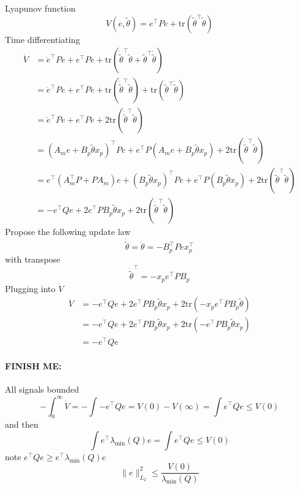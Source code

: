 Lyapunov function
\begin{equation*}
  V(e,\tilde{\theta})=e^{\top}Pe+\text{tr}\left(\tilde{\theta}^{\top}\tilde{\theta}\right)
\end{equation*}
Time differentiating
\begin{align*}
  \dot{V}
  &
  =\dot{e}^{\top}Pe
  +e^{\top}P\dot{e}
  +\text{tr}\left(\dot{\tilde{\theta}}^{\top}\tilde{\theta}+\tilde{\theta}^{\top}\dot{\tilde{\theta}}\right) \\
  &
  =\dot{e}^{\top}Pe
  +e^{\top}P\dot{e}
  +\text{tr}\left(\dot{\tilde{\theta}}^{\top}\tilde{\theta}\right)
  +\text{tr}\left(\tilde{\theta}^{\top}\dot{\tilde{\theta}}\right) \\
  &
  =\dot{e}^{\top}Pe
  +e^{\top}P\dot{e}
  +2\text{tr}\left(\dot{\tilde{\theta}}^{\top}\tilde{\theta}\right) \\
  &
  =(A_{m}e+B_{p}\tilde{\theta}x_{p})^{\top}Pe
  +e^{\top}P(A_{m}e+B_{p}\tilde{\theta}x_{p})
  +2\text{tr}\left(\dot{\tilde{\theta}}^{\top}\tilde{\theta}\right) \\
  &
  =e^{\top}(A_{m}^{\top}P+PA_{m})e
  +(B_{p}\tilde{\theta}x_{p})^{\top}Pe
  +e^{\top}P(B_{p}\tilde{\theta}x_{p})
  +2\text{tr}\left(\dot{\tilde{\theta}}^{\top}\tilde{\theta}\right) \\
  &
  =-e^{\top}Qe
  +2e^{\top}PB_{p}\tilde{\theta}x_{p}
  +2\text{tr}\left(\dot{\tilde{\theta}}^{\top}\tilde{\theta}\right)
\end{align*}
Propose the following update law
\begin{equation*}
  \dot{\tilde{\theta}}=\dot{\theta}=-B_{p}^{\top}Pex_{p}^{\top}
\end{equation*}
with transpose
\begin{equation*}
  \dot{\tilde{\theta}}^{\top}=-x_{p}e^{\top}PB_{p}
\end{equation*}
Plugging into $\dot{V}$
\begin{align*}
  \dot{V}&=-e^{\top}Qe
  +2e^{\top}PB_{p}\tilde{\theta}x_{p}
  +2\text{tr}\left(-x_{p}e^{\top}PB_{p}\tilde{\theta}\right) \\
  &=-e^{\top}Qe
  +2e^{\top}PB_{p}\tilde{\theta}x_{p}
  +2\text{tr}\left(-e^{\top}PB_{p}\tilde{\theta}x_{p}\right) \\
  &=-e^{\top}Qe
\end{align*}

\paragraph{FINISH ME:}
All signals bounded
\begin{equation*}
  -\int_{0}^{\infty}\dot{V}=-\int-e^{\top}Qe=V(0)-V(\infty)=\int e^{\top}Qe\leq V(0)
\end{equation*}
and then
\begin{equation*}
  \int e^{\top}\lambda_{\text{min}}(Q)e=\int e^{\top}Qe\leq V(0)
\end{equation*}
  note $e^{\top}Qe\geq e^{\top}\lambda_{\text{min}}(Q)e$
\begin{equation*}
  \|e\|_{L_{2}}^{2}\leq\frac{V(0)}{\lambda_{\text{min}}(Q)}
\end{equation*}

